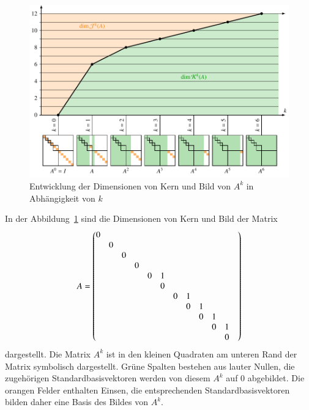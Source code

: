 \begin{figure}
\centering
\includegraphics[width=\textwidth]{chapters/40-eigenwerte/images/jknilp.pdf}
\caption{Entwicklung der Dimensionen von Kern und Bild von $A^k$ in
Abhängigkeit von $k$
\label{buch:eigenwte:fig:jknilp}}
\end{figure}

\begin{beispiel}
In der Abbildung~\ref{buch:eigenwte:fig:jknilp} sind die Dimensionen
von Kern und Bild der Matrix
\[
\setcounter{MaxMatrixCols}{12}
A=\begin{pmatrix}
0& & & & & & & & & & & \\
 &0& & & & & & & & & & \\
 & &0& & & & & & & & & \\
 & & &0& & & & & & & & \\
 & & & &0&1& & & & & & \\
 & & & & &0& & & & & & \\
 & & & & & &0&1& & & & \\
 & & & & & & &0&1& & & \\
 & & & & & & & &0&1& & \\
 & & & & & & & & &0&1& \\
 & & & & & & & & & &0&
\end{pmatrix}
\]
dargestellt.
Die Matrix $A^k$ ist in den kleinen Quadraten am unteren Rand der Matrix
symbolisch dargestellt.
Grüne Spalten bestehen aus lauter Nullen, die zugehörigen
Standardbasisvektoren werden von diesem $A^k$ auf $0$ abgebildet.
Die orangen Felder enthalten Einsen, die entsprechenden Standardbasisvektoren
bilden daher eine Basis des Bildes von $A^k$.
\end{beispiel}

